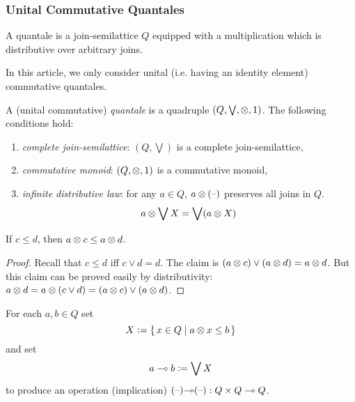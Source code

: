 \subsubsection{Unital Commutative Quantales}
A quantale is a join-semilattice $Q$
equipped with a multiplication which is distributive over arbitrary joins. 
 
In this article, we only consider unital (i.e. having an identity element) commutative quantales. 
\begin{definition}
A (unital commutative) {\em quantale} is a quadruple 
$(Q,\bigvee,\otimes,\mbox{\boldmath{1}})$.
The following conditions hold:
\begin{enumerate}
\item {\em complete join-semilattice}:
$(Q,\bigvee)$ is a complete join-semilattice,
\item {\em commutative monoid}:
$(Q,{\otimes},\mbox{\boldmath{1}})$ is a commutative monoid,
\item {\em infinite distributive law}: 
for any $a \in Q$, $a \otimes {(\mbox{\textendash})}$ preserves all joins in $Q$. 
\[ a \otimes \bigvee X = \bigvee (a \otimes X) \]
\end{enumerate}
\end{definition}
\begin{proposition} 
If $c \leq d$, then $ a \otimes c \leq a \otimes d$.
\end{proposition}
\begin{proof}
Recall that $c \leq d$ iff  $c \vee d = d$.
The claim is $ (a \otimes c) \vee (a \otimes d) = a \otimes d$. 
But this claim can be proved easily by distributivity: 
 $ a \otimes d
= a \otimes (c \vee d)
= (a \otimes c) \vee (a \otimes d)$.
\end{proof}

\begin{definition} [Implication]
For each $a,b \in Q$ set
\[ X  \mathrel{\mathop:}= \set{x \in Q |  a \otimes x \leq b} \]
and set
\[ a \multimap b \mathrel{\mathop:}= \bigvee X \]
to produce an operation (implication) 
$ {{(\mbox{\textendash})}} { \multimap } {{(\mbox{\textendash})}} : Q \times Q \multimap Q$.
\end{definition}

